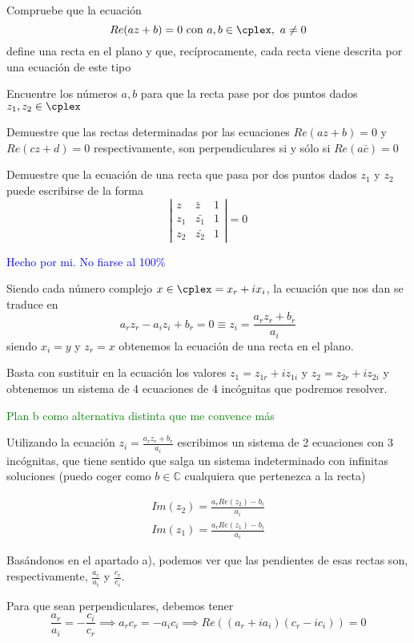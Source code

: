 \begin{problem}[15]

\ppart
Compruebe que la ecuación
\[Re(az+b) = 0 \text{ con } a,b\in \cplex, \ a \neq 0\]
define una recta en el plano y que, recíprocamente, cada recta viene descrita por una ecuación de este tipo

\ppart
Encuentre los números $a,b$ para que la recta pase por dos puntos dados $z_1, z_2 \in \cplex$

\ppart
Demuestre que las rectas determinadas por las ecuaciones $Re(az+b)=0$ y $Re(cz+d)=0$ respectivamente, son perpendiculares si y sólo si $Re(a\bar{c})=0$

\ppart
Demuestre que la ecuación de una recta que pasa por dos puntos dados $z_1$ y $z_2$ puede escribirse de la forma
\[ \left| \begin{array}{ccc}
z  & \bar{z} & 1 \\
z_1 & \bar{z_1}&  1 \\
z_2 & \bar{z_2} & 1 \end{array} \right| = 0\]

\solution
\textcolor{blue}{Hecho por mi. No fiarse al 100\%}

\spart

Siendo cada número complejo $x\in \cplex = x_r+ix_i$, la ecuación que nos dan se traduce en
\[a_rz_r-a_iz_i+b_r=0 \equiv z_i = \frac{a_rz_r+b_r}{a_i}\]
siendo $x_i = y$ y $z_r = x$ obtenemos la ecuación de una recta en el plano.

\spart

Basta con sustituir en la ecuación los valores $z_1=z_{1r}+iz_{1i}$ y $z_2=z_{2r}+iz_{2i}$ y obtenemos un sistema de 4 ecuaciones de 4 incógnitas que podremos resolver.

\textcolor{green}{Plan b como alternativa distinta que me convence más}

Utilizando la ecuación $z_i = \displaystyle\frac{a_rz_r+b_r}{a_i}$ escribimos un sistema de 2 ecuaciones con 3 incógnitas, que tiene sentido que salga un sistema indeterminado con infinitas soluciones (puedo coger como $b∈ℂ$ cualquiera que pertenezca a la recta)

\[
\begin{array}{cc}
Im(z_2) = \frac{a_r Re(z_2) - b_i}{a_i}\\
Im(z_1) = \frac{a_r Re(z_1) - b_i}{a_i}
\end{array}
\]

\spart

Basándonos en el apartado a), podemos ver que las pendientes de esas rectas son, respectivamente, $\frac{a_r}{a_i}$ y $\frac{c_r}{c_i}$.

Para que sean perpendiculares, debemos tener
\[\frac{a_r}{a_i}= - \frac{c_i}{c_r} \implies a_rc_r = -a_ic_i \implies Re\left((a_r+ia_i)(c_r-ic_i)\right) = 0\]

\spart

\end{problem}

